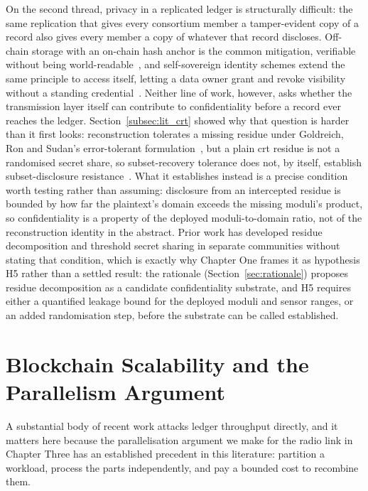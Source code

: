 \documentclass[12pt,a4paper,oneside]{book}
\begin{document}
On the second thread, privacy in a replicated ledger is structurally
difficult: the same replication that gives every consortium member a
tamper-evident copy of a record also gives every member a copy of whatever
that record discloses. Off-chain storage with an on-chain hash anchor is
the common mitigation, verifiable without being
world-readable~\cite{kim2023privacy}, and self-sovereign identity schemes
extend the same principle to access itself, letting a data owner grant and
revoke visibility without a standing
credential~\cite{amraouy2025ssi}. Neither line of work, however, asks
whether the transmission layer itself can contribute to confidentiality
before a record ever reaches the ledger. Section~\ref{subsec:lit_crt}
showed why that question is harder than it first looks: reconstruction
tolerates a missing residue under Goldreich, Ron and Sudan's
error-tolerant formulation~\cite{goldreich1999china}, but a plain
\gls{crt} residue is not a randomised secret share, so subset-recovery
tolerance does not, by itself, establish subset-disclosure
resistance~\cite{shoup2009computational}. What it establishes instead is
a precise condition worth testing rather than assuming: disclosure from
an intercepted residue is bounded by how far the plaintext's domain
exceeds the missing moduli's product, so confidentiality is a property of
the deployed moduli-to-domain ratio, not of the reconstruction identity
in the abstract. Prior work has developed residue decomposition and
threshold secret sharing in separate communities
without stating that condition, which is exactly why Chapter One frames
it as hypothesis H5 rather than a settled result: the rationale
(Section~\ref{sec:rationale}) proposes residue decomposition as a
candidate confidentiality substrate, and H5 requires either a quantified
leakage bound for the deployed moduli and sensor ranges, or an added
randomisation step, before the substrate can be called established.

\section{Blockchain Scalability and the Parallelism Argument}
\label{subsec:lit_scalability}

A substantial body of recent work attacks ledger throughput directly, and it
matters here because the parallelisation argument we make for the radio link
in Chapter Three has an established precedent in this literature: partition a
workload, process the parts independently, and pay a bounded cost to
recombine them.
\end{document}
